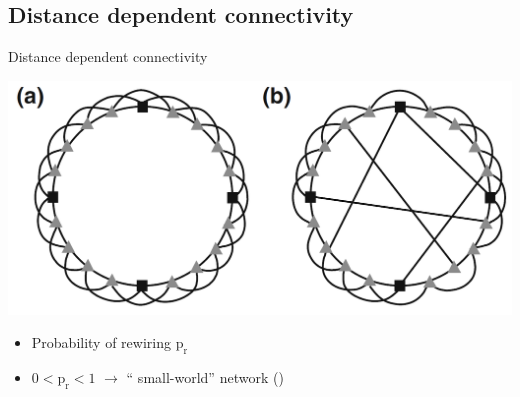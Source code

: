 \documentclass[fleqn]{beamer}
\newcommand{\curldoquom}[1]{\textquotedblleft
#1\textquotedblright\hspace{.01mm}}
\newcommand{\ppc}[1]{\pause\setcounter{page}{#1}}
\begin{document}
\subsection{Distance dependent connectivity}


\begin{frame}{Distance dependent connectivity}
  \begin{center}
    \includegraphics[width=.6\textwidth]{figures/kriener_dist1a}
  \end{center}
    \begin{flushright}
      {\footnotesize \cite{Kriener2009}}
    \end{flushright}
    \begin{itemize}
     \item Probability of rewiring ${\mathrm{p_r}}$\ppc{10}
     \item $0<{\mathrm{p_r}}<1$ $\rightarrow$ \curldoquom{small-world} network
({\footnotesize \cite{Watts1998}})
    \end{itemize}
\end{frame}
\end{document}
